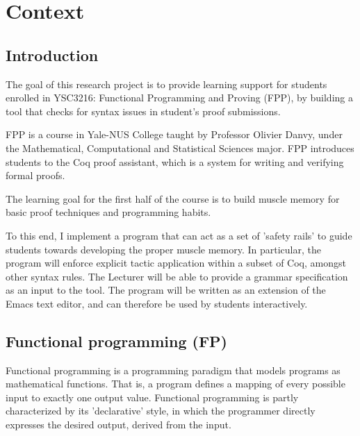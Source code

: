 
\chapter{Context} %

\label{context} %


\section{Introduction}
The goal of this research project is to provide learning support for students enrolled in YSC3216: Functional Programming and Proving (FPP), by building a tool that checks for syntax issues in student's proof submissions.

FPP is a course in Yale-NUS College taught by Professor Olivier Danvy, under the Mathematical, Computational and Statistical Sciences major. FPP introduces students to the Coq proof assistant, which is a system for writing and verifying formal proofs.

The learning goal for the first half of the course is to build muscle memory for basic proof techniques and programming habits.

To this end, I implement a program that can act as a set of 'safety rails' to guide students towards developing the proper muscle memory. In particular, the program will enforce explicit tactic application within a subset of Coq, amongst other syntax rules. The Lecturer will be able to provide a grammar specification as an input to the tool. The program will be written as an extension of the Emacs text editor, and can therefore be used by students interactively.

\section{Functional programming (FP)}
Functional programming is a programming paradigm that models programs as mathematical functions. That is, a program defines a mapping of every possible input to exactly one output value. Functional programming is partly characterized by its 'declarative' style, in which the programmer directly expresses the desired output, derived from the input.

